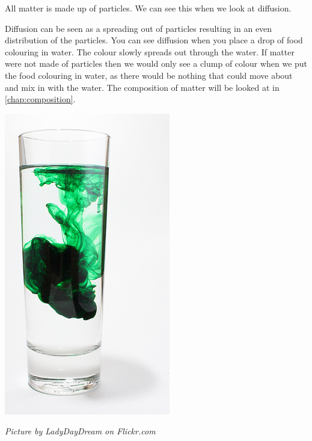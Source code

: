 \label{m38736*id324876121}All matter is made up of particles. We can see this when we look at diffusion.
\begin{minipage}{.5\textwidth}
Diffusion can be seen as a spreading out of particles resulting in an even distribution of the particles. You can see diffusion when you place a drop of food colouring in water. The colour slowly spreads out through the water. If matter were not made of particles then we would only see a clump of colour when we put the food colouring in water, as there would be nothing that could move about and mix in with the water. The composition of matter will be looked at in \ref{chap:composition}. 
\end{minipage}
\begin{minipage}{.5\textwidth}
\begin{center}
 \includegraphics[height=.5\textwidth]{photos/diffusionby-LadyDayDream-flickr.jpg}\par
\textit{Picture by LadyDayDream on Flickr.com}
\end{center}
\end{minipage}

